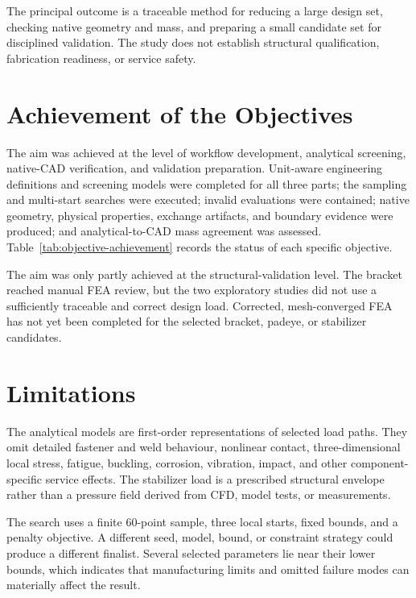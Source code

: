 The principal outcome is a traceable method for reducing a large design set,
checking native geometry and mass, and preparing a small candidate set for
disciplined validation. The study does not establish structural
qualification, fabrication readiness, or service safety.

\section{Achievement of the Objectives}
\label{sec:aim-achievement}

The aim was achieved at the level of workflow development, analytical
screening, native-CAD verification, and validation preparation. Unit-aware
engineering definitions and screening models were completed for all three
parts; the sampling and multi-start searches were executed; invalid
evaluations were contained; native geometry, physical properties, exchange
artifacts, and boundary evidence were produced; and analytical-to-CAD mass
agreement was assessed. Table~\ref{tab:objective-achievement} records the
status of each specific objective.

The aim was only partly achieved at the structural-validation level. The
bracket reached manual FEA review, but the two exploratory studies did not use
a sufficiently traceable and correct design load. Corrected, mesh-converged
FEA has not yet been completed for the selected bracket, padeye, or stabilizer
candidates.

\section{Limitations}
\label{sec:conclusion-limitations}

The analytical models are first-order representations of selected load paths.
They omit detailed fastener and weld behaviour, nonlinear contact,
three-dimensional local stress, fatigue, buckling, corrosion, vibration,
impact, and other component-specific service effects. The stabilizer load is a
prescribed structural envelope rather than a pressure field derived from CFD,
model tests, or measurements.

The search uses a finite 60-point sample, three local starts, fixed bounds, and
a penalty objective. A different seed, model, bound, or constraint strategy
could produce a different finalist. Several selected parameters lie near
their lower bounds, which indicates that manufacturing limits and omitted
failure modes can materially affect the result.

